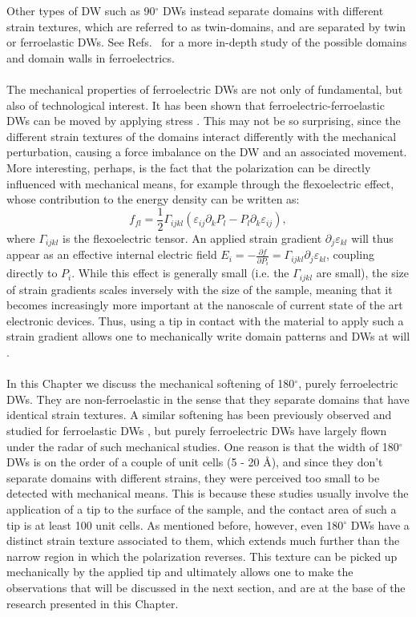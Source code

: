 Other types of DW such as 90$^\circ$ DWs instead separate domains with different strain textures, which are referred to as twin-domains, and are separated by twin or ferroelastic DWs.
See Refs.~\cite{Cao1991,Hu1998,Marton2010} for a more in-depth study of the possible domains and domain walls in ferroelectrics.
\\\\
The mechanical properties of ferroelectric DWs are not only of fundamental, but also of technological interest.
It has been shown that ferroelectric-ferroelastic DWs can be moved by applying stress \cite{Schneider2001}.
This may not be so surprising, since the different strain textures of the domains interact differently with the mechanical perturbation, causing a force imbalance on the DW and an associated movement.
More interesting, perhaps, is the fact that the polarization can be directly influenced with mechanical means, for example through the flexoelectric effect, whose contribution to the energy density can be written as:
\begin{equation}
	\label{eq:BTO_flexoelectricity}
	f_{fl} = \frac{1}{2}\Gamma_{ijkl}(\varepsilon_{ij}\partial_kP_l-P_l\partial_k\varepsilon_{ij}),
\end{equation}
where $\Gamma_{ijkl}$ is the flexoelectric tensor.
An applied strain gradient $\partial_j\varepsilon_{kl}$ will thus appear as an effective internal electric field $E_{i} = -\frac{\partial f}{\partial P_i} = \Gamma_{ijkl}\partial_j\varepsilon_{kl}$, coupling directly to $P_i$.
While this effect is generally small (i.e. the $\Gamma_{ijkl}$ are small), the size of strain gradients scales inversely with the size of the sample, meaning that it becomes increasingly more important at the nanoscale of current state of the art electronic devices.
Thus, using a tip in contact with the material to apply such a strain gradient allows one to mechanically write domain patterns and DWs at will \cite{Lu2012,Abdollahi2015, Cordero-Edwards2017,Cordero-Edwards2019}.
\\\\
In this Chapter we discuss the mechanical softening of 180$^\circ$, purely ferroelectric DWs. They are non-ferroelastic in the sense that they separate domains that have identical strain textures.
A similar softening has been previously observed and studied for ferroelastic DWs \cite{Lee2003,Scott2012}, but purely ferroelectric DWs have largely flown under the radar of such mechanical studies.
One reason is that the width of 180$^\circ$ DWs is on the order of a couple of unit cells (5 - 20 \AA \cite{Zhirnov1959}), and since they don't separate domains with different strains, they were perceived too small to be detected with mechanical means.
This is because these studies usually involve the application of a tip to the surface of the sample, and the contact area of such a tip is at least 100 unit cells.
As mentioned before, however, even 180$^\circ$ DWs have a distinct strain texture associated to them, which extends much further than the narrow region in which the polarization reverses.
This texture can be picked up mechanically by the applied tip and ultimately allows one to make the observations that will be discussed in the next section, and are at the base of the research presented in this Chapter.

